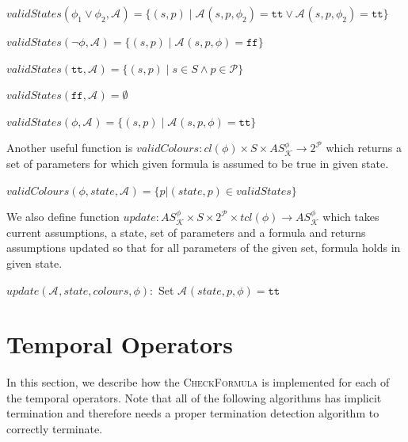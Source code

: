 \documentclass[12pt,oneside,draft]{fithesis2}
\newcommand{\as}[1][]{\ensuremath{\mathcal{A}_{#1}}}
\newcommand{\ASphi}{\ensuremath{AS_{\mathcal K}^\phi}}
\newcommand{\method}[1]{\textnormal{\textsc{#1}}}
\newcommand{\true}{\ensuremath{\texttt{tt}}}
\newcommand{\false}{\ensuremath{\texttt{ff}}}
\newcommand{\params}{\mathcal{P}}
\begin{document}
			\begin{center}
				$validStates(\phi_1 \vee \phi_2, \as) = \{ (s, p) \mid \as(s, p, \phi_2) = \true \vee \as(s, p, \phi_2) = \true \} $
			\end{center}
			
			\begin{center}
				$validStates(\neg\phi, \as) = \{ (s, p) \mid \as(s, p, \phi) = \false \} $
			\end{center}
			
			\begin{center}
				$validStates(\true, \as) = \{ (s, p) \mid s \in S \wedge p \in \params \} $
			\end{center}

			\begin{center}
				$validStates(\false, \as) = \emptyset $
			\end{center}
						
			\begin{center}
				$validStates(\phi, \as) = \{ (s, p) \mid \as(s, p, \phi) = \true \} $
			\end{center}

			Another useful function is $validColours : cl(\phi) \times S \times \ASphi \rightarrow 2^\mathcal{P}	$ which returns a set of parameters for which given formula is assumed to be true in given state. 
			
			\begin{center}
				$validColours(\phi, state, \as) = \{ p | (state, p) \in validStates \}$
			\end{center}
			
			We also define function $update: \ASphi \times S \times 2^{\params} \times tcl(\phi) \rightarrow \ASphi $ which takes current assumptions, a state, set of parameters and a formula and returns assumptions updated so that for all parameters of the given set, formula holds in given state.
			
			\begin{algorithmic}
				\State $ update(\as, state, colours, \phi): $
					\State Set $ \as(state, p, \phi) = \true $
				\EndFor 
			\end{algorithmic}
			
		\section{Temporal Operators}
    
    		In this section, we describe how the \method{CheckFormula} is implemented for each of the temporal operators. Note that all of the following algorithms has implicit termination and therefore needs a proper termination detection algorithm to correctly terminate.
    		
\end{document}
